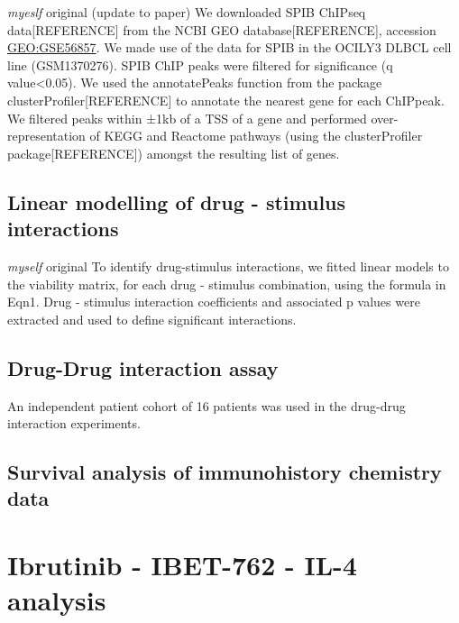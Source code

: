 \documentclass[11pt, a4paper, twosided]{book}
\begin{document}
\emph{myeslf} original (update to paper)
We downloaded SPIB ChIPseq data{[}REFERENCE{]} from the NCBI GEO database{[}REFERENCE{]}, accession \url{GEO:GSE56857}. We made use of the data for SPIB in the OCILY3 DLBCL cell line (GSM1370276). SPIB ChIP peaks were filtered for significance (q value\textless0.05). We used the annotatePeaks function from the package clusterProfiler{[}REFERENCE{]} to annotate the nearest gene for each ChIPpeak. We filtered peaks within ±1kb of a TSS of a gene and performed over-representation of KEGG and Reactome pathways (using the clusterProfiler package{[}REFERENCE{]}) amongst the resulting list of genes.

\hypertarget{linear-modelling-of-drug---stimulus-interactions-1}{%
\subsection{Linear modelling of drug - stimulus interactions}\label{linear-modelling-of-drug---stimulus-interactions-1}}

\emph{myself} original
To identify drug-stimulus interactions, we fitted linear models to the viability matrix, for each drug - stimulus combination, using the formula in Eqn1. Drug - stimulus interaction coefficients and associated p values were extracted and used to define significant interactions.

\hypertarget{drug-drug-interaction-assay}{%
\subsection{Drug-Drug interaction assay}\label{drug-drug-interaction-assay}}

An independent patient cohort of 16 patients was used in the drug-drug interaction experiments.

\hypertarget{survival-analysis-of-immunohistory-chemistry-data}{%
\subsection{Survival analysis of immunohistory chemistry data}\label{survival-analysis-of-immunohistory-chemistry-data}}

\hypertarget{ibrutinib---ibet-762---il-4-analysis}{%
\section{Ibrutinib - IBET-762 - IL-4 analysis}\label{ibrutinib---ibet-762---il-4-analysis}}
\end{document}
